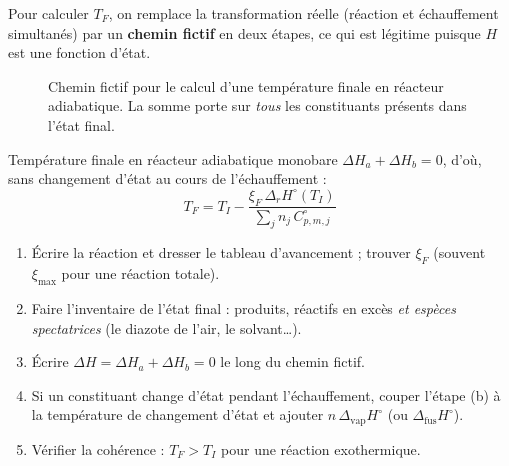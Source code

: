 Pour calculer $T_F$, on remplace la transformation réelle (réaction et échauffement simultanés) par un \textbf{chemin fictif} en deux étapes, ce qui est légitime puisque $H$ est une fonction d'état.

\begin{figure}[H]
\centering
{}
\caption{Chemin fictif pour le calcul d'une température finale en réacteur adiabatique. La somme porte sur \emph{tous} les constituants présents dans l'état final.}
\label{fig:cheminfictif}
\end{figure}

\begin{resultat}{Température finale en réacteur adiabatique monobare}
$\Delta H_a + \Delta H_b = 0$, d'où, sans changement d'état au cours de l'échauffement :
\[ \boxed{T_F = T_I - \frac{\xi_F\,\Delta_rH^\circ(T_I)}{\sum_j n_j\,C^\circ_{p,m,j}}} \]
\end{resultat}

\begin{methode}
\begin{enumerate}
  \item Écrire la réaction et dresser le tableau d'avancement ; trouver $\xi_F$ (souvent $\xi_{\max}$ pour une réaction totale).
  \item Faire l'inventaire de l'état final : produits, réactifs en excès \emph{et espèces spectatrices} (le diazote de l'air, le solvant\dots).
  \item Écrire $\Delta H = \Delta H_a + \Delta H_b = 0$ le long du chemin fictif.
  \item Si un constituant change d'état pendant l'échauffement, couper l'étape (b) à la température de changement d'état et ajouter $n\,\Delta_{\text{vap}}H^\circ$ (ou $\Delta_{\text{fus}}H^\circ$).
  \item Vérifier la cohérence : $T_F > T_I$ pour une réaction exothermique.
\end{enumerate}
\end{methode}

